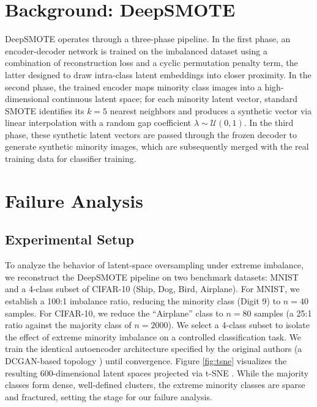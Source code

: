 \documentclass[conference]{IEEEtran}
\begin{document}
\section{Background: DeepSMOTE}
\label{sec:background}
DeepSMOTE \cite{dablain2022deepsmote} operates through a three-phase pipeline. In the first phase, an encoder-decoder network is trained on the imbalanced dataset using a combination of reconstruction loss and a cyclic permutation penalty term, the latter designed to draw intra-class latent embeddings into closer proximity. In the second phase, the trained encoder maps minority class images into a high-dimensional continuous latent space; for each minority latent vector, standard SMOTE identifies its $k=5$ nearest neighbors and produces a synthetic vector via linear interpolation with a random gap coefficient $\lambda \sim \mathcal{U}(0, 1)$. In the third phase, these synthetic latent vectors are passed through the frozen decoder to generate synthetic minority images, which are subsequently merged with the real training data for classifier training.

\section{Failure Analysis}
\label{sec:failure}

\subsection{Experimental Setup}
\label{subsec:setup}
To analyze the behavior of latent-space oversampling under extreme imbalance, we reconstruct the DeepSMOTE \cite{dablain2022deepsmote} pipeline on two benchmark datasets: MNIST \cite{lecun1998gradient} and a 4-class subset of CIFAR-10 \cite{krizhevsky2009learning} (Ship, Dog, Bird, Airplane). For MNIST, we establish a 100:1 imbalance ratio, reducing the minority class (Digit 9) to $n=40$ samples. For CIFAR-10, we reduce the ``Airplane'' class to $n=80$ samples (a 25:1 ratio against the majority class of $n=2000$). We select a 4-class subset to isolate the effect of extreme minority imbalance on a controlled classification task. We train the identical autoencoder architecture specified by the original authors (a DCGAN-based topology \cite{radford2015unsupervised}) until convergence. Figure \ref{fig:tsne} visualizes the resulting 600-dimensional latent spaces projected via t-SNE \cite{vandermaaten2008tsne}. While the majority classes form dense, well-defined clusters, the extreme minority classes are sparse and fractured, setting the stage for our failure analysis.
\end{document}
